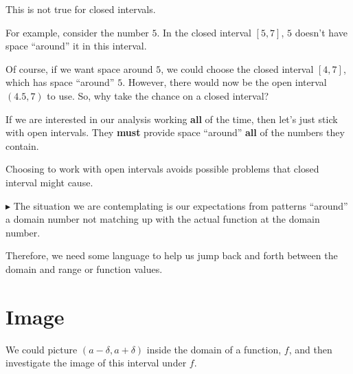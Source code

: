 \documentclass{ximera}
\begin{document}
This is not true for closed intervals.


For example, consider the number $5$.  In the closed interval $[5, 7]$,  $5$ doesn't have space ``around'' it in this interval. 

Of course, if we want space around $5$, we could choose the closed interval $[4,7]$, which has space ``around'' $5$.  However, there would now be the open interval $(4.5, 7)$ to use.  So, why take the chance on a closed interval?  

If we are interested in our analysis working \textbf{\textcolor{red!70!black}{all}} of the time, then let's just stick with open intervals.  They \textbf{must} provide space ``around'' \textbf{\textcolor{red!70!black}{all}} of the numbers they contain. 

Choosing to work with open intervals avoids possible problems that closed interval might cause.






\textbf{\textcolor{red!70!darkgray}{$\blacktriangleright$}} The situation we are contemplating is our expectations from patterns ``around'' a domain number not matching up with the actual function at the domain number.

Therefore, we need some language to help us jump back and forth between the domain and range or function values.





















\section*{Image}


We could picture $(a-\delta, a+\delta)$ inside the domain of a function, $f$, and then investigate the image of this interval under $f$.  
\end{document}
